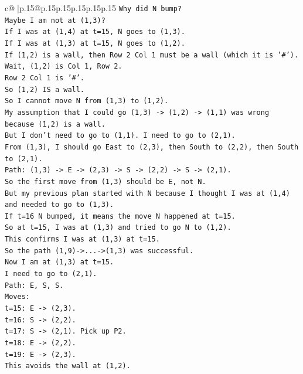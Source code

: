 \documentclass{article}
\begin{document}
{\begin{supertabular}{c@{$\;$}|p{.15\linewidth}@{}p{.15\linewidth}p{.15\linewidth}p{.15\linewidth}p{.15\linewidth}p{.15\linewidth}}
{{{\texttt{Why did N bump?} \\
\texttt{Maybe I am not at (1,3)?} \\
\texttt{If I was at (1,4) at t=15, N goes to (1,3).} \\
\texttt{If I was at (1,3) at t=15, N goes to (1,2).} \\
\texttt{If (1,2) is a wall, then Row 2 Col 1 must be a wall (which it is '\#').} \\
\texttt{Wait, (1,2) is Col 1, Row 2.} \\
\texttt{Row 2 Col 1 is '\#'.} \\
\texttt{So (1,2) IS a wall.} \\
\texttt{So I cannot move N from (1,3) to (1,2).} \\
\texttt{My assumption that I could go (1,3) {-}> (1,2) {-}> (1,1) was wrong because (1,2) is a wall.} \\
\texttt{But I don't need to go to (1,1). I need to go to (2,1).} \\
\texttt{From (1,3), I should go East to (2,3), then South to (2,2), then South to (2,1).} \\
\texttt{Path: (1,3) {-}> E {-}> (2,3) {-}> S {-}> (2,2) {-}> S {-}> (2,1).} \\
\texttt{So the first move from (1,3) should be E, not N.} \\
\texttt{But my previous plan started with N because I thought I was at (1,4) and needed to go to (1,3).} \\
\texttt{If t=16 N bumped, it means the move N happened at t=15.} \\
\texttt{So at t=15, I was at (1,3) and tried to go N to (1,2).} \\
\texttt{This confirms I was at (1,3) at t=15.} \\
\texttt{So the path (1,9){-}>...{-}>(1,3) was successful.} \\
\texttt{Now I am at (1,3) at t=15.} \\
\texttt{I need to go to (2,1).} \\
\texttt{Path: E, S, S.} \\
\texttt{Moves:} \\
\texttt{t=15: E {-}> (2,3).} \\
\texttt{t=16: S {-}> (2,2).} \\
\texttt{t=17: S {-}> (2,1). Pick up P2.} \\
\texttt{t=18: E {-}> (2,2).} \\
\texttt{t=19: E {-}> (2,3).} \\
\texttt{This avoids the wall at (1,2).} \\
}}}
\end{supertabular}}
\end{document}
